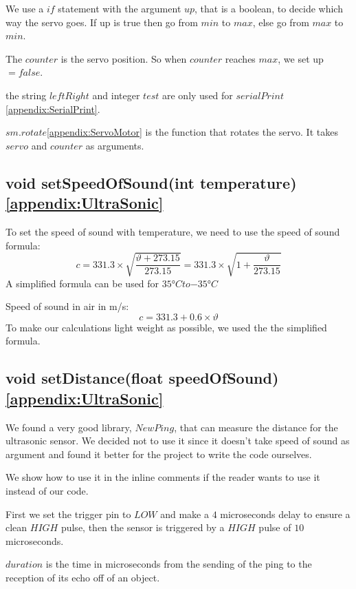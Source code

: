We use a $if$ statement with the argument $up$, that is a boolean, to decide which way the servo goes. If up is true then go from $min$ to $max$, else go from $max$ to $min$. 

The $counter$ is the servo position. So when $counter$ reaches $max$, we set up $= false$.

the string $leftRight$ and integer $test$ are only used for $serialPrint$\ref{appendix:SerialPrint}.

$sm.rotate$\ref{appendix:ServoMotor} is the function that rotates the servo. It takes $servo$ and $counter$ as arguments.

\subsection{void setSpeedOfSound(int temperature)\ref{appendix:UltraSonic}}
To set the speed of sound with temperature, we need to use the speed of sound formula:
\begin{equation}
c = 331.3 \times \sqrt{\frac{\vartheta + 273.15}{273.15}} = 331.3 \times \sqrt{1 + \frac{\vartheta}{273.15}}
\end{equation}
A simplified formula can be used for $\ang{+35} C to \ang{-35} C$

Speed of sound in air in m/s:
\begin{equation}
c=331.3 + 0.6 \times \vartheta
\end{equation}
To make our calculations light weight as possible, we used the the simplified formula.

\subsection{void setDistance(float speedOfSound)\ref{appendix:UltraSonic}}
We found a very good library, $NewPing$, that can measure the distance for the ultrasonic sensor. We decided not to use it since it doesn't take speed of sound as argument and found it better for the project to write the code ourselves. 

We show how to use it in the inline comments if the reader wants to use it instead of our code.

First we set the trigger pin to $LOW$ and make a $4$ microseconds delay to ensure a clean $HIGH$ pulse, then the sensor is triggered by a $HIGH$ pulse of $10$ microseconds.

$duration$ is the time in microseconds from the sending of the ping to the reception of its echo off of an object.

